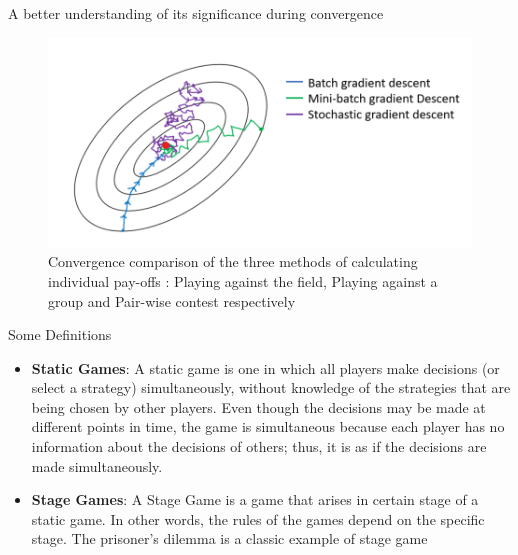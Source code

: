 \documentclass{IFES-beamer}
\begin{document}
        \begin{frame}{A better understanding of its significance during convergence}
            \begin{figure}[H]
                \centering
                \includegraphics[scale=0.25]{Images/GD.png}
                \caption{Convergence comparison of the three methods of calculating individual pay-offs : Playing against the field, Playing against a group and Pair-wise contest respectively}
                \label{fig:GD}
            \end{figure}
        \end{frame}
        
        \begin{frame}{Some Definitions}
            \begin{itemize}
                \item \textbf{Static Games}: A static game is one in which all players make decisions (or select a strategy) simultaneously, without knowledge of the strategies that are being chosen by other players. Even though the decisions may be made at different points in time, the game is simultaneous because each player has no information about the decisions of others; thus, it is as if the decisions are made simultaneously.
                \item \textbf{Stage Games}: A Stage Game is a game that arises in certain stage of a static game. In other words, the rules of the games depend on the specific stage. The prisoner’s dilemma is a classic example of stage game
            \end{itemize}
        \end{frame}
        

\end{document}
